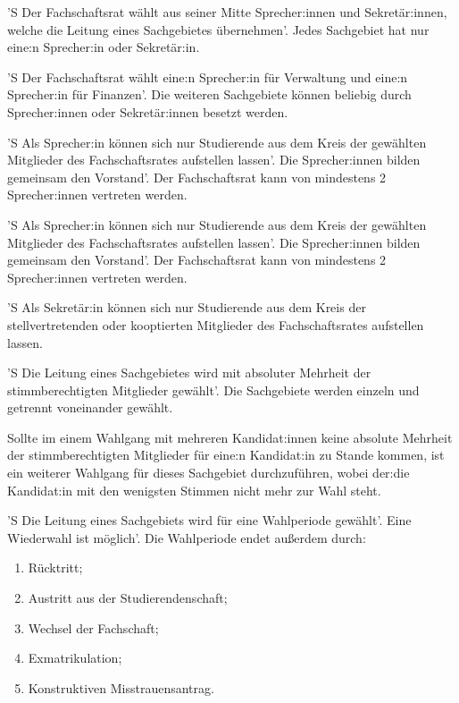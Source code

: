 \documentclass[%
    parskip=half,
]{scrartcl}
\begin{document}
\begin{contract}

'S Der Fachschaftsrat wählt aus seiner Mitte Sprecher:innen und Sekretär:innen, welche die Leitung eines Sachgebietes übernehmen'.
Jedes Sachgebiet hat nur eine:n Sprecher:in oder Sekretär:in.

'S Der Fachschaftsrat wählt eine:n Sprecher:in für Verwaltung und eine:n Sprecher:in für Finanzen'.
Die weiteren Sachgebiete können beliebig durch Sprecher:innen oder Sekretär:innen besetzt werden.

'S Als Sprecher:in können sich nur Studierende aus dem Kreis der gewählten Mitglieder des Fachschaftsrates aufstellen lassen'.
Die Sprecher:innen bilden gemeinsam den Vorstand'.
Der Fachschaftsrat kann von mindestens 2 Sprecher:innen vertreten werden.

'S Als Sprecher:in können sich nur Studierende aus dem Kreis der gewählten Mitglieder des Fachschaftsrates aufstellen lassen'.
Die Sprecher:innen bilden gemeinsam den Vorstand'.
Der Fachschaftsrat kann von mindestens 2 Sprecher:innen vertreten werden.

'S Als Sekretär:in können sich nur Studierende aus dem Kreis der stellvertretenden oder kooptierten Mitglieder des Fachschaftsrates aufstellen lassen.


'S Die Leitung eines Sachgebietes wird mit absoluter Mehrheit der stimmberechtigten Mitglieder gewählt'.
Die Sachgebiete werden einzeln und getrennt voneinander gewählt.

Sollte im einem Wahlgang mit mehreren Kandidat:innen keine absolute Mehrheit der stimmberechtigten Mitglieder für eine:n Kandidat:in zu Stande kommen, ist ein weiterer Wahlgang für dieses Sachgebiet durchzuführen, wobei der:die Kandidat:in mit den wenigsten Stimmen nicht mehr zur Wahl steht.

'S Die Leitung eines Sachgebiets wird für eine Wahlperiode gewählt'. 
Eine Wiederwahl ist möglich'.
Die Wahlperiode endet außerdem durch:
\begin{enumerate}[\qquad a)]
    \item Rücktritt;
    \item Austritt aus der Studierendenschaft;
    \item Wechsel der Fachschaft;
    \item Exmatrikulation;
    \item Konstruktiven Misstrauensantrag.
\end{enumerate}


\end{contract}
\end{document}
